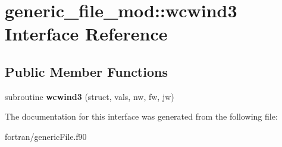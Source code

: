\hypertarget{interfacegeneric__file__mod_1_1wcwind3}{}\section{generic\+\_\+file\+\_\+mod\+:\+:wcwind3 Interface Reference}
\label{interfacegeneric__file__mod_1_1wcwind3}
\subsection*{Public Member Functions}
\begin{DoxyCompactItemize}
\item 
\mbox{\label{interfacegeneric__file__mod_1_1wcwind3_aec5ecd1e306bb43d3e136201aa80a140}} 
subroutine {\bfseries wcwind3} (struct, vals, nw, fw, jw)
\end{DoxyCompactItemize}


The documentation for this interface was generated from the following file\+:\begin{DoxyCompactItemize}
\item 
fortran/generic\+File.\+f90\end{DoxyCompactItemize}
